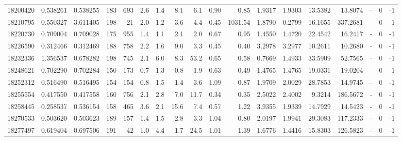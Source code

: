 \begin{tabular}{rrrrrrrrrrrrrrrlrr}
  18200420 & 0.538261 &   0.538255 &  183 &  693 &      2.6 &      1.4 &     8.1 &      6.1 &       0.90 &        0.85 &  1.9317 &  1.9303 &   13.5382 &   13.8074 &             - &        0 &         -1 \\
  18210795 & 0.550327 &   3.611405 &  198 &   21 &      2.0 &      1.2 &     3.6 &      4.4 &       0.45 &     1031.54 &  1.8790 &  0.2799 &   16.1655 &  337.2681 &             - &        0 &         -1 \\
  18220730 & 0.709004 &   0.709028 &  175 &  955 &      1.4 &      1.1 &     2.1 &      2.0 &       0.67 &        0.95 &  1.4550 &  1.4720 &   22.4542 &   16.2417 &             - &        0 &         -1 \\
  18226590 & 0.312466 &   0.312469 &  188 &  758 &      2.2 &      1.6 &     9.0 &      3.3 &       0.45 &        0.40 &  3.2978 &  3.2977 &   10.2611 &   10.2680 &             - &        0 &         -1 \\
  18232336 & 1.356537 &   0.678282 &  198 &  745 &      2.1 &      6.0 &     8.3 &     53.2 &       0.65 &        0.58 &  0.7669 &  1.4933 &   33.5909 &   52.7565 &             - &        0 &         -1 \\
  18248621 & 0.702290 &   0.702284 &  150 &  173 &      0.7 &      1.3 &     0.8 &      1.9 &       0.63 &        0.49 &  1.4765 &  1.4765 &   19.0331 &   19.0204 &             - &        0 &         -1 \\
  18252312 & 0.516490 &   0.516495 &  154 &  154 &      0.8 &      1.5 &     1.4 &      3.6 &       1.09 &        0.87 &  1.9709 &  2.0029 &   28.7853 &   14.9745 &             - &        0 &         -1 \\
  18255554 & 0.417550 &   0.417558 &  160 &  756 &      2.1 &      2.8 &     7.0 &     11.7 &       0.34 &        0.35 &  2.5022 &  2.4002 &    9.3214 &  186.5672 &             - &        0 &         -1 \\
  18258445 & 0.258537 &   0.536154 &  158 &  465 &      3.6 &      2.1 &    15.6 &      7.4 &       0.57 &        1.22 &  3.9355 &  1.9339 &   14.7929 &   14.5423 &             - &        0 &         -1 \\
  18270533 & 0.503620 &   0.503623 &  189 &  157 &      1.4 &      1.5 &     2.8 &      3.3 &       1.04 &        0.80 &  2.0197 &  1.9941 &   29.3083 &  117.2333 &             - &        0 &         -1 \\
  18277497 & 0.619404 &   0.697506 &  191 &   42 &      1.0 &      4.4 &     1.7 &     24.5 &       1.01 &        1.39 &  1.6776 &  1.4416 &   15.8303 &  126.5823 &             - &        0 &         -1 \\

\end{tabular}
